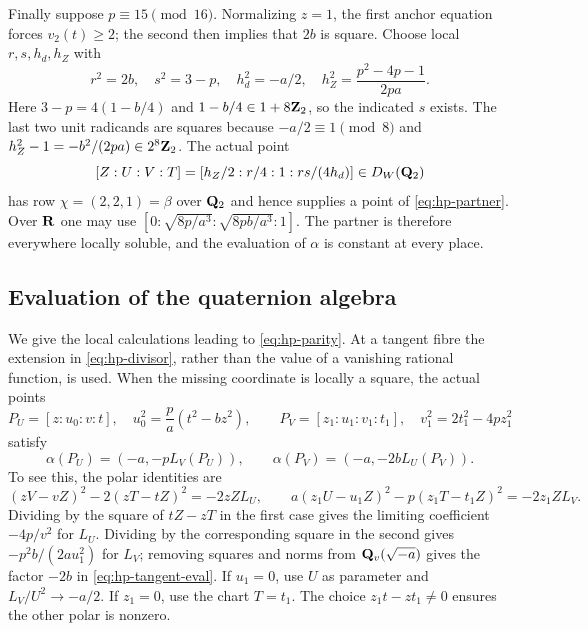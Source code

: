 Finally suppose $p\equiv15\pmod {16}$.  Normalizing $z=1$, the
first anchor equation forces $v_2(t)\ge2$; the second then implies
that $2b$ is square.  Choose local $r,s,h_d,h_Z$ with
\[
 r^2=2b,\quad s^2=3-p,\quad h_d^2=-a/2,\quad
 h_Z^2=\frac{p^2-4p-1}{2pa}.
\]
Here $3-p=4(1-b/4)$ and $1-b/4\in1+8\mathbf Z_2$, so the indicated $s$ exists.
The last two unit radicands are squares because
$-a/2\equiv1\pmod8$ and
$h_Z^2-1=-b^2/(2pa)\in2^8\mathbf Z_2$.
The actual point
\[
 [Z:U:V:T]=[h_Z/2:r/4:1:rs/(4h_d)]\in D_W(\mathbf Q_2)
\]
has row $\chi=(2,2,1)=\beta$ over $\mathbf Q_2$ and hence supplies a point
of \eqref{eq:hp-partner}.  Over $\mathbf R$ one may use
$[0:\sqrt{8p/a^3}:\sqrt{8pb/a^3}:1]$.
The partner is therefore everywhere locally soluble, and the evaluation
of $\alpha$ is constant at every place.

\subsection{Evaluation of the quaternion algebra}

We give the local calculations leading to \eqref{eq:hp-parity}.
At a tangent fibre the extension in \eqref{eq:hp-divisor}, rather than
the value of a vanishing rational function, is used.  When the missing
coordinate is locally a square, the actual points
\[
 P_U=[z:u_0:v:t],\quad u_0^2=\frac p a(t^2-bz^2),\qquad
 P_V=[z_1:u_1:v_1:t_1],\quad v_1^2=2t_1^2-4pz_1^2
\]
satisfy
\begin{equation}\label{eq:hp-tangent-eval}
 \alpha(P_U)=(-a,-pL_V(P_U)),\qquad
 \alpha(P_V)=(-a,-2bL_U(P_V)).
\end{equation}
To see this, the polar identities are
\[
 (zV-vZ)^2-2(zT-tZ)^2=-2zZL_U,
 \qquad
 a(z_1U-u_1Z)^2-p(z_1T-t_1Z)^2=-2z_1ZL_V.
\]
Dividing by the square of $tZ-zT$ in the first case gives the limiting
coefficient $-4p/v^2$ for $L_U$.  Dividing by the corresponding square
in the second gives $-p^2b/(2au_1^2)$ for $L_V$; removing squares and
norms from $\mathbf Q_v(\sqrt{-a})$ gives the factor $-2b$ in
\eqref{eq:hp-tangent-eval}.  If $u_1=0$, use $U$ as parameter and
$L_V/U^2\to-a/2$.  If $z_1=0$, use the chart $T=t_1$.
The choice $z_1t-zt_1\ne0$ ensures the other polar is nonzero.

